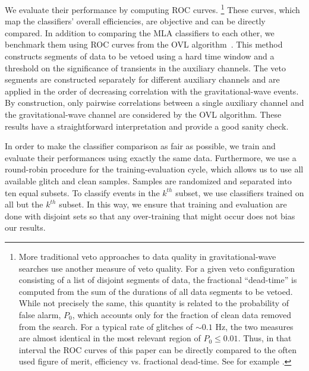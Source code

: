 \documentclass[prd, twocolumn, lengthcheck, superscriptaddress, showpacs, letterpaper, nofootinbib]{revtex4-1}
\begin{document}
We evaluate their performance by computing \ac{ROC} curves. \footnote{More traditional veto approaches to data quality in gravitational-wave searches use another measure of veto quality. For a given veto configuration consisting of a list of disjoint segments of data, the fractional ``dead-time'' is computed from the sum of the durations of all data segments to be vetoed. While not precisely the same, this quantity is related to the probability of false alarm, $P_0$, which accounts only for the fraction of clean data removed from the search. For a typical rate of glitches of ${\sim}0.1$ Hz, the two measures are almost identical in the most relevant region of $P_0 \le
0.01$. Thus, in that interval the \ac{ROC} curves of this paper can be directly compared to the often used figure of merit, efficiency vs.
fractional dead-time. See for example \cite{Smith:2011an}.} These curves, which map the classifiers' overall efficiencies, are objective and can be directly compared. In addition to comparing the \ac{MLA} classifiers to each other, we benchmark  them using \ac{ROC} curves from the \ac{OVL} algorithm~\cite{OVL}. This method constructs segments of data to be vetoed using a hard time window and a threshold on the significance of transients in the auxiliary channels. The veto segments are constructed separately for different auxiliary channels and are applied in the order of decreasing correlation with the gravitational-wave events. By construction, only pairwise correlations between a single auxiliary channel and the gravitational-wave channel are considered by the \ac{OVL} algorithm. These results have a straightforward interpretation and provide a good sanity check. %

In order to make the classifier comparison as fair as possible, we train and evaluate their performances using exactly the same data. Furthermore, we use a round-robin procedure for the training-evaluation cycle, which allows us to use all available glitch and clean samples. Samples are randomized and separated into ten equal subsets. To classify events in the $k^{th}$ subset, we use classifiers trained on all but the $k^{th}$ subset. In this way, we ensure that training and evaluation are done with disjoint sets so that any over-training that might occur does not bias our results. 
\end{document}
